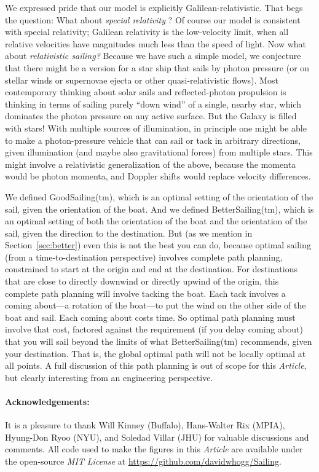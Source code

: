 \documentclass[letterpaper]{article}
\newcommand{\documentname}{\textsl{Article}}
\newcommand{\secref}[1]{Section~\ref{#1}}
\begin{document}
We expressed pride that our model is explicitly Galilean-relativistic.
That begs the question: What about \emph{special relativity} \cite{sr}?
Of course our model is consistent with special relativity; Galilean relativity is the low-velocity limit, when all relative velocities have magnitudes much less than the speed of light.
Now what about \emph{relativistic sailing?}
Because we have such a simple model, we conjecture that there might be a version for a star ship that sails by photon pressure (or on stellar winds or supernovae ejecta or other quasi-relativistic flows).
Most contemporary thinking about solar sails and reflected-photon propulsion is thinking in terms of sailing purely ``down wind'' of a single, nearby star, which dominates the photon pressure on any active surface.
But the Galaxy is filled with stars!
With multiple sources of illumination, in principle one might be able to make a photon-pressure vehicle that can sail or tack in arbitrary directions, given illumination (and maybe also gravitational forces) from multiple stars.
This might involve a relativistic generalization of the above, because the momenta would be photon momenta, and Doppler shifts would replace velocity differences.

We defined GoodSailing(tm), which is an optimal setting of the orientation of the sail, given the orientation of the boat.
And we defined BetterSailing(tm), which is an optimal setting of both the orientation of the boat and the orientation of the sail, given the direction to the destination.
But (as we mention in \secref{sec:better}) even this is not the best you can do, because optimal sailing (from a time-to-destination perspective) involves complete path planning, constrained to start at the origin and end at the destination.
For destinations that are close to directly downwind or directly upwind of the origin, this complete path planning will involve tacking the boat.
Each tack involves a coming about---a rotation of the boat---to put the wind on the other side of the boat and sail.
Each coming about costs time.
So optimal path planning must involve that cost, factored against the requirement (if you delay coming about) that you will sail beyond the limits of what BetterSailing(tm) recommends, given your destination.
That is, the global optimal path will not be locally optimal at all points.
A full discussion of this path planning is out of scope for this \documentname, but clearly interesting from an engineering perspective.

\paragraph{Acknowledgements:}
It is a pleasure to thank
  Will Kinney (Buffalo),
  Hans-Walter Rix (MPIA),
  Hyung-Don Ryoo (NYU), and
  Soledad Villar (JHU)
for valuable discussions and comments.
All code used to make the figures in this \documentname{} are available under the open-source \textsl{MIT License} at \url{https://github.com/davidwhogg/Sailing}.



\end{document}
